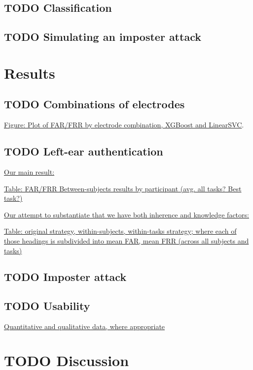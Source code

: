 \documentclass[11pt]{article}
\begin{document}
\subsection{{\bfseries\sffamily TODO} Classification}
\label{sec:org717cdb9}
\subsection{{\bfseries\sffamily TODO} Simulating an imposter attack}
\label{sec:orgdd6e8bd}
\section{Results}
\label{sec:org6705b1d}
\subsection{{\bfseries\sffamily TODO} Combinations of electrodes}
\label{sec:org21b14ae}

\uline{Figure: Plot of FAR/FRR by electrode combination, XGBoost and LinearSVC}.

\subsection{{\bfseries\sffamily TODO} Left-ear authentication}
\label{sec:org82cbcf4}

\uline{Our main result:}

\uline{Table: FAR/FRR Between-subjects results by participant (avg. all tasks? Best task?)}

\uline{Our attempt to substantiate that we have both inherence and knowledge factors:}

\uline{Table: original strategy, within-subjects, within-tasks strategy; where each of those headings is subdivided into mean FAR, mean FRR (across all subjects and tasks)}

\subsection{{\bfseries\sffamily TODO} Imposter attack}
\label{sec:orgac58a1b}

\subsection{{\bfseries\sffamily TODO} Usability}
\label{sec:org18d5968}

\uline{Quantitative and qualitative data, where appropriate}

\section{{\bfseries\sffamily TODO} Discussion}
\label{sec:orgcd35710}
\end{document}
